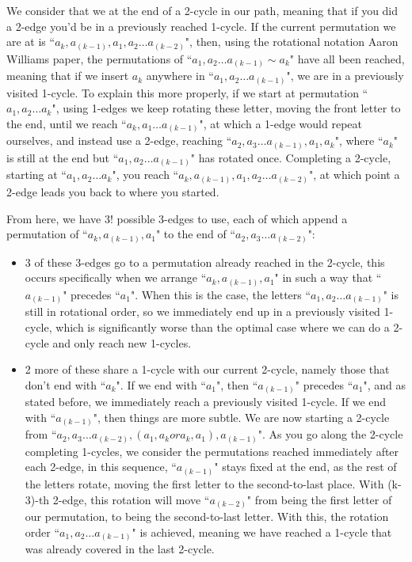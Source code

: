 \documentclass{article}
\newcommand{\edit}[1]{}%
\newcommand{\rough}[1]{}%
\begin{document}
\rough{Rotational notation, dealing with 2-cycles and the like}

We consider that we at the end of a 2-cycle in our path, meaning that if you did a 2-edge you'd be in a previously reached 1-cycle.\edit{ can be formalized by lemmas of 4.1} If the current permutation we are at is ``$a_k,a_{(k-1)},a_1, a_2 \dots a_{(k-2)}$", then, using the rotational notation Aaron Williams paper, the permutations of ``$a_1,a_2\dots  a_{(k-1)} \sim a_k$" have all been reached, meaning that if we insert $a_k$ anywhere in ``$a_1,a_2\dots  a_{(k-1)}$", we are in a previously visited 1-cycle. To explain this more properly, if we start at permutation ``$a_1,a_2\dots  a_k$", using 1-edges we keep rotating these letter, moving the front letter to the end, until we reach ``$a_k, a_1 \dots  a_{(k-1)}$", at which a 1-edge would repeat ourselves, and instead use a 2-edge, reaching ``$a_2,a_3 \dots  a_{(k-1)},a_1,a_k$", where ``$a_k$" is still at the end but ``$a_1,a_2\dots a_{(k-1)}$" has rotated once. Completing a 2-cycle, starting at ``$a_1,a_2\dots a_k$", you reach ``$a_k,a_{(k-1)},a_1, a_2 \dots  a_{(k-2)}$", at which point a 2-edge leads you back to where you started.\edit{ Rotational notation can be introduced better, or maybe avoided altogether; should be more concise/broken apart}

\vspace{1.75em}

\rough{3-edge shenanigans} From here, we have 3! possible 3-edges to use, each of which append a permutation of ``$a_k,a_(k-1),a_1$"  to the end of ``$a_2,a_3\dots  a_(k-2)$":

\begin{itemize}
    \item 3 of these 3-edges go to a permutation already reached in the 2-cycle, this occurs specifically when we arrange ``$a_k,a_(k-1),a_1$" in such a way that ``$a_(k-1)$" precedes ``$a_1$". When this is the case, the letters ``$a_1,a_2\dots  a_(k-1)$" is still in rotational order, so we  immediately end up in a previously visited 1-cycle, which is significantly worse than the optimal case where we can do a 2-cycle and only reach new 1-cycles.
    \item 2 more of these share a 1-cycle with our current 2-cycle, namely those that don't end with ``$a_k$". If we end with ``$a_1$", then ``$a_(k-1)$" precedes ``$a_1$", and as stated before, we immediately reach a previously visited 1-cycle. If we end with ``$a_{(k-1)}$", then things are more subtle. We are now starting a 2-cycle from ``$a_2,a_3\dots  a_{(k-2)}, (a_1,a_k or a_k,a_1), a_{(k-1)}$". As you go along the 2-cycle completing 1-cycles, we consider the permutations reached immediately after each 2-edge, in this sequence, ``$a_{(k-1)}$" stays fixed at the end, as the rest of the letters rotate, moving the first letter to the second-to-last place. With (k-3)-th 2-edge, this rotation will move ``$a_{(k-2)}$" from being the first letter of our permutation, to being the second-to-last letter. With this, the rotation order ``$a_1,a_2\dots  a_{(k-1)}$" is achieved, meaning we have reached a 1-cycle that was already covered in the last 2-cycle.
\end{itemize}
\end{document}

